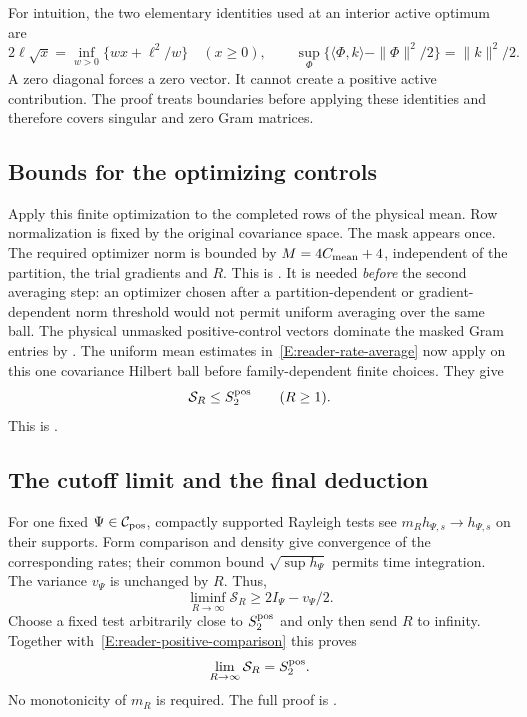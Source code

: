 For intuition, the two elementary identities used at an interior active optimum
are
\[
  2\ell\sqrt{x}=\inf_{w>0}\{wx+\ell^2/w\}\quad(x\ge0),
  \qquad
  \sup_\Phi\{\langle\Phi,k\rangle-\|\Phi\|^2/2\}
  =\|k\|^2/2.
\]
A zero diagonal forces a zero vector. It cannot create a positive active
contribution. The proof treats boundaries before applying these identities and
therefore covers singular and zero Gram matrices.

\subsection{Bounds for the optimizing controls}

Apply this finite optimization to the completed rows of the physical mean. Row
normalization is fixed by the original covariance space. The mask appears once.
The required optimizer norm is bounded by $M = 4C_{\rm mean}+4$, independent of
the partition, the trial gradients and $R$. This is
. It is needed \emph{before} the
second averaging step: an optimizer chosen after a partition-dependent or
gradient-dependent norm threshold would not permit uniform averaging over the same ball. The physical unmasked positive-control vectors dominate the masked
Gram entries by . The uniform mean
estimates in~\eqref{E:reader-rate-average} now apply on this one covariance
Hilbert ball before family-dependent finite choices. They give
\begin{equation}\label{E:reader-positive-comparison}
  \mathcal{S}_R\le S^{\mathrm{pos}}_2\qquad(R\ge1).
\end{equation}
This is .

\subsection{The cutoff limit and the final deduction}

For one fixed $\Psi \in \mathcal C_{\mathrm{pos}}$, compactly supported Rayleigh tests see
$m_Rh_{\Psi,s} \to h_{\Psi,s}$ on their supports. Form comparison and density
give convergence of the corresponding rates; their common bound $\sqrt{\sup
h_{\Psi}}$ permits time integration. The variance $v_\Psi$ is unchanged by $R$.
Thus,
\[
  \liminf_{R\to\infty}\mathcal{S}_R\ge2I_\Psi-v_\Psi/2.
\]
Choose a fixed test arbitrarily close to $S^{\mathrm{pos}}_2$ and only then send $R$ to
infinity. Together with~\eqref{E:reader-positive-comparison} this proves
\begin{equation}\label{E:reader-cutoff}
  \lim_{R\to\infty}\mathcal{S}_R=S^{\mathrm{pos}}_2.
\end{equation}
No monotonicity of $m_R$ is required. The full proof is
.

